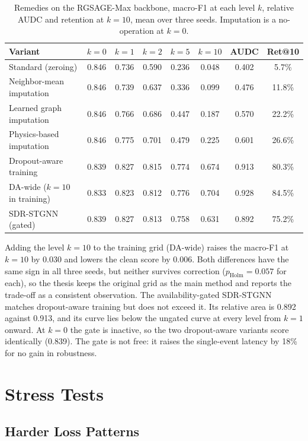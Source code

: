 \documentclass[MTech]{ugthesis}
\begin{document}
\begin{table}[htbp]
\caption{Remedies on the RGSAGE-Max backbone, macro-F1 at each level $k$, relative \acs{AUDC} and retention at $k=10$, mean over three seeds. Imputation is a no-operation at $k=0$.}
\label{tab:remedies}
\small
\centering
\begin{tabular}{@{}lccccccc@{}}
\toprule
Variant & $k=0$ & $k=1$ & $k=2$ & $k=5$ & $k=10$ & AUDC & Ret@10 \\
\midrule
Standard (zeroing) & 0.846 & 0.736 & 0.590 & 0.236 & 0.048 & 0.402 & 5.7\% \\
Neighbor-mean imputation & 0.846 & 0.739 & 0.637 & 0.336 & 0.099 & 0.476 & 11.8\% \\
Learned graph imputation & 0.846 & 0.766 & 0.686 & 0.447 & 0.187 & 0.570 & 22.2\% \\
Physics-based imputation & 0.846 & 0.775 & 0.701 & 0.479 & 0.225 & 0.601 & 26.6\% \\
Dropout-aware training & 0.839 & 0.827 & 0.815 & 0.774 & 0.674 & 0.913 & 80.3\% \\
DA-wide ($k=10$ in training) & 0.833 & 0.823 & 0.812 & 0.776 & 0.704 & 0.928 & 84.5\% \\
\acs{SDR-STGNN} (gated) & 0.839 & 0.827 & 0.813 & 0.758 & 0.631 & 0.892 & 75.2\% \\
\bottomrule
\end{tabular}
\end{table}

Adding the level $k=10$ to the training grid (DA-wide) raises the macro-F1 at $k=10$ by 0.030 and lowers the clean score by 0.006. Both differences have the same sign in all three seeds, but neither survives correction ($p_{\mathrm{Holm}}=0.057$ for each), so the thesis keeps the original grid as the main method and reports the trade-off as a consistent observation. The availability-gated \ac{SDR-STGNN} matches dropout-aware training but does not exceed it. Its relative area is 0.892 against 0.913, and its curve lies below the ungated curve at every level from $k=1$ onward. At $k=0$ the gate is inactive, so the two dropout-aware variants score identically (0.839). The gate is not free: it raises the single-event latency by 18\% for no gain in robustness.

\section{Stress Tests}

\subsection{Harder Loss Patterns}
\end{document}
